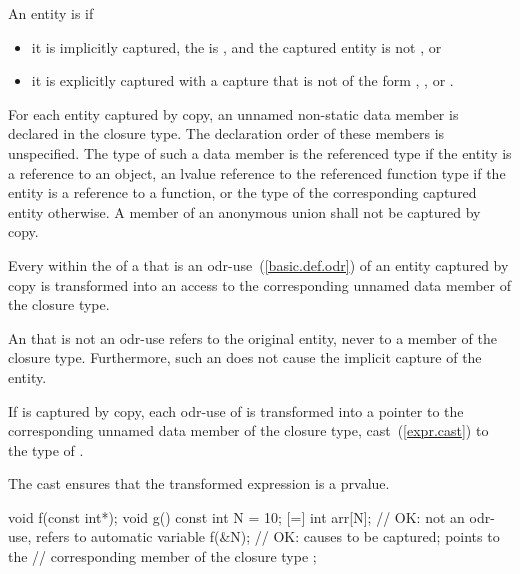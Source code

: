\pnum
An entity is  if
\begin{itemize}
\item
it is implicitly captured,
the  is \tcode{=}, and
the captured entity is not , or
\item
it is explicitly captured with a capture that is not of the form
,
\tcode{\&} , or
\tcode{\&}  .
\end{itemize}
For each entity captured by copy, an
unnamed non-static data member is declared in the closure type. The declaration order of
these members is unspecified. The type of such a data member is
the referenced type if the entity is a reference to an object,
an lvalue reference to the referenced function type if the entity is a reference to a function, or
the type of the corresponding captured entity otherwise.
A member of an anonymous union shall not be captured by copy.

\pnum
Every  within the  of a
 that is an odr-use~(\ref{basic.def.odr}) of an
entity captured by copy is transformed into an access to the corresponding unnamed data
member of the closure type.
\begin{note} An  that is not an odr-use refers to
the original entity, never to a member of the closure type. Furthermore, such
an  does not cause the implicit capture of the
entity. \end{note}
If  is captured by copy, each odr-use of  is
transformed into a pointer to the corresponding unnamed data member of the closure type,
cast~(\ref{expr.cast}) to the type of . \begin{note} The cast ensures that the
transformed expression is a prvalue. \end{note} \begin{example}
\begin{codeblock}
void f(const int*);
void g() {
  const int N = 10;
  [=] {
    int arr[N];             // OK: not an odr-use, refers to automatic variable
    f(&N);                  // OK: causes  to be captured;  points to the
                            // corresponding member of the closure type
  };
}
\end{codeblock}
\end{example}

